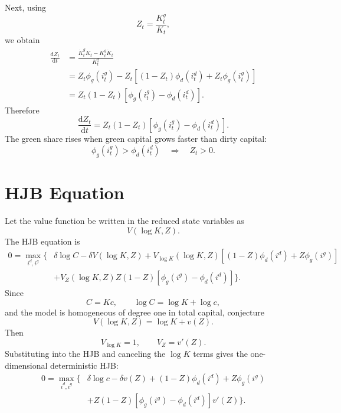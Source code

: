 \documentclass[11pt]{article}
\newcommand{\dd}{\mathrm{d}}
\begin{document}
Next, using
\begin{equation}
    Z_t=\frac{K^g_t}{K_t},
\end{equation}
we obtain
\begin{align}
    \frac{\dd Z_t}{\dd t}
    &=
    \frac{\dot K^g_t K_t-K^g_t\dot K_t}{K_t^2} \\
    &=
    Z_t\phi_g(i^g_t)
    -
    Z_t\left[(1-Z_t)\phi_d(i^d_t)+Z_t\phi_g(i^g_t)\right] \\
    &=
    Z_t(1-Z_t)\left[\phi_g(i^g_t)-\phi_d(i^d_t)\right].
\end{align}
Therefore
\begin{equation}
    \boxed{
    \frac{\dd Z_t}{\dd t}
    =
    Z_t(1-Z_t)\left[\phi_g(i^g_t)-\phi_d(i^d_t)\right].
    }
\end{equation}
The green share rises when green capital grows faster than dirty capital:
\begin{equation}
    \phi_g(i^g_t)>\phi_d(i^d_t)
    \quad\Longrightarrow\quad
    \dot Z_t>0.
\end{equation}

\section{HJB Equation}

Let the value function be written in the reduced state variables as
\begin{equation}
    V(\log K,Z).
\end{equation}
The HJB equation is
\begin{align}
    0
    =
    \max_{i^d,i^g}
    \Bigg\{
    &\delta\log C
    -\delta V(\log K,Z)
    +V_{\log K}(\log K,Z)
    \left[(1-Z)\phi_d(i^d)+Z\phi_g(i^g)\right]
    \nonumber\\
    &+V_Z(\log K,Z)
    Z(1-Z)\left[\phi_g(i^g)-\phi_d(i^d)\right]
    \Bigg\}.
\end{align}
Since
\begin{equation}
    C=Kc,
    \qquad
    \log C=\log K+\log c,
\end{equation}
and the model is homogeneous of degree one in total capital, conjecture
\begin{equation}
    V(\log K,Z)=\log K+v(Z).
\end{equation}
Then
\begin{equation}
    V_{\log K}=1,
    \qquad
    V_Z=v'(Z).
\end{equation}
Substituting into the HJB and canceling the $\log K$ terms gives the one-dimensional deterministic HJB:
\begin{equation}
    \boxed{
    \begin{aligned}
    0
    =
    \max_{i^d,i^g}
    \Big\{
    &\delta\log c
    -\delta v(Z)
    +(1-Z)\phi_d(i^d)+Z\phi_g(i^g)
    \\
    &+Z(1-Z)\left[\phi_g(i^g)-\phi_d(i^d)\right]v'(Z)
    \Big\}.
    \end{aligned}
    }
\end{equation}
\end{document}
